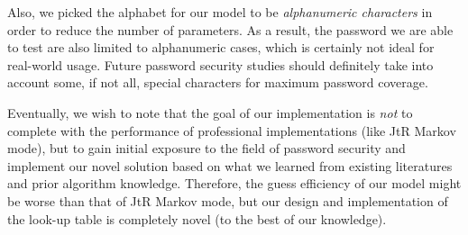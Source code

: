 \documentclass{article} %
\theoremstyle{definition}
\theoremstyle{theorem}
\theoremstyle{remark}
\theoremstyle{remark}
\begin{document}
\par\quad Also, we picked the alphabet for our model to be \emph{alphanumeric characters} in order to reduce the number of parameters. As a result, the password we are able to test are also limited to alphanumeric cases, which is certainly not ideal for real-world usage. Future password security studies should definitely take into account some, if not all, special characters for maximum password coverage. 

\par\quad Eventually, we wish to note that the goal of our implementation is \emph{not} to complete with the performance of professional implementations (like JtR Markov mode), but to gain initial exposure to the field of password security and implement our novel solution based on what we learned from existing literatures and prior algorithm knowledge. Therefore, the guess efficiency of our model might be worse than that of JtR Markov mode, but our design and implementation of the look-up table is completely novel (to the best of our knowledge).
\end{document}
